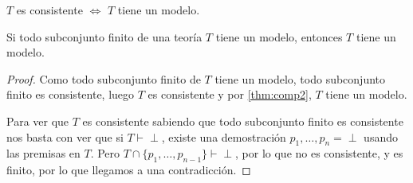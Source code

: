 \documentclass{apuntes}
\begin{document}
\begin{theorem}
	$T$ es consistente $\iff$ $T$ tiene un modelo.
	\label{thm:comp2}
\end{theorem}

\begin{theorem}
	Si todo subconjunto finito de una teoría $T$ tiene un modelo, entonces $T$ tiene un modelo.
\end{theorem}
\begin{proof}
	Como todo subconjunto finito de $T$ tiene un modelo, todo subconjunto finito es consistente, luego $T$ es consistente y por \ref{thm:comp2}, $T$ tiene un modelo.

	Para ver que $T$ es consistente sabiendo que todo subconjunto finito es consistente nos basta con ver que si $T\vdash \perp$, existe una demostración $p_1, \hdots, p_n = \perp$ usando las premisas en $T$. Pero $T\cap\{p_1,\hdots,p_{n-1}\}\vdash \perp$, por lo que no es consistente, y es finito, por lo que llegamos a una contradicción.
\end{proof}

\printindex
\end{document}
